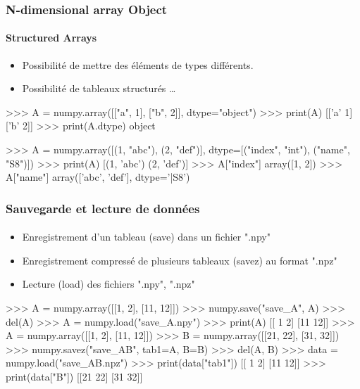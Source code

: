 \begin{frame}[fragile]
\frametitle{N-dimensional array Object}
\framesubtitle{Structured Arrays}
\begin{itemize}
 \item Possibilité de mettre des éléments de types différents.  
 \item Possibilité de tableaux structurés \dots
\end{itemize}
\begin{pythonConsole}
>>> A = numpy.array([["a", 1], ["b", 2]], dtype="object")
>>> print(A)
[['a' 1]
 ['b' 2]]
>>> print(A.dtype)
object

>>> A = numpy.array([(1, "abc"), (2, "def")], dtype=[("index", "int"), 
	("name", "S8")])
>>> print(A)
[(1, 'abc') (2, 'def')]
>>> A["index"]
array([1, 2])
>>> A["name"]
array(['abc', 'def'], 
      dtype='|S8')
\end{pythonConsole}
\end{frame}
\begin{frame}[fragile]
\frametitle{Sauvegarde et lecture de données}
\framesubtitle{}
\begin{itemize}
 \item Enregistrement d'un tableau (save) dans un fichier ".npy"
 \item Enregistrement compressé de plusieurs tableaux (savez) au format ".npz"
 \item Lecture (load) des fichiers ".npy", ".npz"
\end{itemize}
\begin{pythonConsole}
>>> A = numpy.array([[1, 2], [11, 12]])
>>> numpy.save("save_A", A)
>>> del(A)
>>> A = numpy.load("save_A.npy")
>>> print(A)
[[ 1  2]
 [11 12]]
>>> A = numpy.array([[1, 2], [11, 12]])
>>> B = numpy.array([[21, 22], [31, 32]])
>>> numpy.savez("save_AB", tab1=A, B=B)
>>> del(A, B)
>>> data = numpy.load("save_AB.npz")
>>> print(data["tab1"])
[[ 1  2]
 [11 12]]
>>> print(data["B"])
[[21 22]
 [31 32]]
\end{pythonConsole}
\end{frame}
